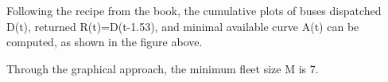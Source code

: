 \documentclass[12pt]{article}
\newcommand{\customsubsection}[1]{
  \subsection*{Problem \thesection.#1}
}
\begin{document}
Following the recipe from the book, the cumulative plots of buses dispatched D(t), returned R(t)=D(t-1.53), and minimal available curve A(t) can be computed, as shown in the figure above.

Through the graphical approach, the minimum fleet size M is 7.
\newpage

\end{document}
